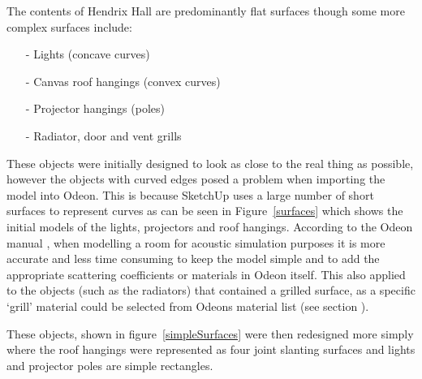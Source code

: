 \documentclass[../../main.tex]{subfiles}
\begin{document}
			The contents of Hendrix Hall are predominantly flat surfaces though some more complex surfaces include:

			\begin{itemize}
				\item[-] Lights (concave curves) 
				\item[-] Canvas roof hangings (convex curves) 
				\item[-] Projector hangings (poles)
				\item[-] Radiator, door and vent grills \\
			\end{itemize}

			These objects were initially designed to look as close to the real thing as possible, however the objects with curved edges posed a problem when importing the model into Odeon. This is because SketchUp uses a large number of short surfaces to represent curves as can be seen in Figure~\ref{surfaces} which shows the initial models of the lights, projectors and roof hangings. According to the Odeon manual \cite{odeonManual}, when modelling a room for acoustic simulation purposes it is more accurate and less time consuming to keep the model simple and to add the appropriate scattering coefficients or materials in Odeon itself. This also applied to the objects (such as the radiators) that contained a grilled surface, as a specific `grill' material could be selected from Odeons material list (see section ).


			These objects, shown in figure~\ref{simpleSurfaces} were then redesigned more simply where the roof hangings were represented as four joint slanting surfaces and lights and projector poles are simple rectangles.
\end{document}
